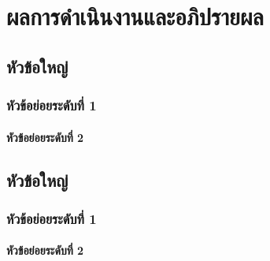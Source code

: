\chapter{ผลการดำเนินงานและอภิปรายผล}
\label{chapter4}

\section{หัวข้อใหญ่}

\subsection{หัวข้อย่อยระดับที่ 1}

\subsubsection{หัวข้อย่อยระดับที่ 2}

\section{หัวข้อใหญ่}

\subsection{หัวข้อย่อยระดับที่ 1}

\subsubsection{หัวข้อย่อยระดับที่ 2}


